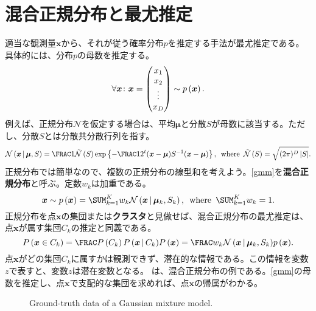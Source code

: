 \documentclass[10pt,a4paper]{book}
\begin{document}
\chapter{混合正規分布と最尤推定\label{chap:gmm}}

適当な観測量$\bm{x}$から、それが従う確率分布$p$を推定する手法が最尤推定である。具体的には、分布$p$の母数を推定する。
%
\begin{equation}
\forall\bm{x}\colon \bm{x} =
\begin{pmatrix}
x_1\\
x_2\\
\vdots\\
x_D
\end{pmatrix}
\sim \prob{\bm{x}}.
\end{equation}
%
例えば、正規分布$\mathcal{N}$を仮定する場合は、平均$\bm{\mu}$と分散$S$が母数に該当する。ただし、分散$S$とは分散共分散行列を指す。
%
\begin{equation}
\label{eq:gmm:n}
\Nd{\bm{x}}{\bm{\mu},S} =
\frac{1}{\Nn{S}} \exp \seq{-\frac{1}{2} \trans{(\bm{x}-\bm{\mu})} S^{-1} (\bm{x}-\bm{\mu})},
\where
\Nn{S} = \sqrt{(2\pi)^D\abs{S}}.
\end{equation}
%
正規分布では簡単なので、複数の正規分布の線型和を考えよう。\eqref{gmm}を\textbf{混合正規分布}と呼ぶ。定数$w_k$は加重である。
%
\begin{equation}
\label{eq:gmm}
\bm{x} \sim \prob{\bm{x}} = \sum_{k=1}^K w_k \Nd{\bm{x}}{\bm{\mu}_k,S_k},
\where
\sum_{k=1}^K w_k = 1.
\end{equation}
%
正規分布を点$\bm{x}$の集団または\textbf{クラスタ}と見做せば、混合正規分布の最尤推定は、点$\bm{x}$が属す集団$C_k$の推定と同義である。
%
\begin{equation}
\Prob{\bm{x} \in C_k} =
\frac{\Prob{C_k}\Prob{\bm{x}}[C_k]}{\Prob{\bm{x}}} =
\frac{w_k \Nd{\bm{x}}{\bm{\mu}_k,S_k}}{\prob{\bm{x}}}.
\end{equation}
%
点$\bm{x}$がどの集団$C_k$に属すかは観測できず、潜在的な情報である。この情報を変数$z$で表すと、変数$z$は潜在変数となる。
は、混合正規分布の例である。\eqref{gmm}の母数を推定し、点$\bm{x}$で支配的な集団を求めれば、点$\bm{x}$の帰属がわかる。

\begin{figure}[h]
\centering
{}
\caption{Ground-truth data of a Gaussian mixture model.\label{fig:gmm}}
\end{figure}
\end{document}
